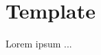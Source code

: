 \documentclass[Template]{subfiles}
\begin{document}
\section{Template}
\label{sec:Template}
Lorem ipsum ...
\end{document}
